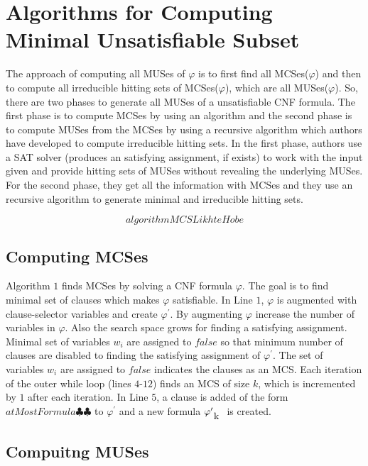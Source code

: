 \section{Algorithms for Computing Minimal Unsatisfiable Subset}
\label{sec:algorithms for computing minimal unsatisfiable subset}
The approach of computing all MUSes of $\varphi$ is to first find all MCSes($\varphi$) and then to compute all irreducible hitting sets of MCSes($\varphi$), which are all MUSes($\varphi$). So, there are two phases to generate all MUSes of a unsatisfiable CNF formula. The first phase is to compute MCSes by using an algorithm and the second phase is to compute MUSes from the MCSes by using a recursive algorithm which authors have developed to compute irreducible hitting sets.\newline
In the first phase, authors use a SAT solver (produces an satisfying assignment, if exists) to work with the input given and provide hitting sets of MUSes without revealing the underlying MUSes. For the second phase, they get all the information with MCSes and they use an recursive algorithm to generate minimal and irreducible hitting sets. 

$$algorithmMCSLikhteHobe$$
\subsection{Computing MCSes}
Algorithm $1$ finds MCSes by solving a CNF formula $\varphi$. The goal is to find minimal set of clauses which makes $\varphi$ satisfiable. In Line $1$, $\varphi$ is augmented with clause-selector variables and create $\varphi^{\prime}$. By augmenting $\varphi$ increase the number of variables in $\varphi$. Also the search space grows for finding a satisfying assignment. Minimal set of variables $w_{i}$ are assigned to $false$ so that minimum number of clauses are disabled to finding the satisfying assignment of $\varphi^{\prime}$. The set of variables $w_{i}$ are assigned to $false$ indicates the clauses as an MCS.\newline
Each iteration of the outer while loop (lines $4$-$12$) finds an MCS of size $k$, which is incremented by $1$ after each iteration. In Line $5$, a clause is added of the form $atMostFormula\clubsuit\clubsuit$ to $\varphi^{\prime}$ and a new formula $\varphi^{\prime}_{\text k}$ is created.
\subsection{Compuitng MUSes}
